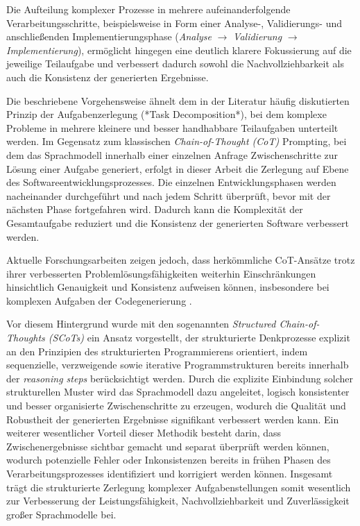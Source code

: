 Die Aufteilung komplexer Prozesse in mehrere aufeinanderfolgende Verarbeitungsschritte, beispielsweise in Form einer Analyse-, Validierungs- und anschließenden Implementierungsphase (\textit{Analyse} $\rightarrow$ \textit{Validierung} $\rightarrow$ \textit{Implementierung}), ermöglicht hingegen eine deutlich klarere Fokussierung auf die jeweilige Teilaufgabe und verbessert dadurch sowohl die Nachvollziehbarkeit als auch die Konsistenz der generierten Ergebnisse.

Die beschriebene Vorgehensweise ähnelt dem in der Literatur häufig diskutierten Prinzip der Aufgabenzerlegung (*Task Decomposition*), bei dem komplexe Probleme in mehrere kleinere und besser handhabbare Teilaufgaben unterteilt werden. Im Gegensatz zum klassischen \textit{Chain-of-Thought (CoT)} Prompting, bei dem das Sprachmodell innerhalb einer einzelnen Anfrage Zwischenschritte zur Lösung einer Aufgabe generiert, erfolgt in dieser Arbeit die Zerlegung auf Ebene des Softwareentwicklungsprozesses. Die einzelnen Entwicklungsphasen werden nacheinander durchgeführt und nach jedem Schritt überprüft, bevor mit der nächsten Phase fortgefahren wird. Dadurch kann die Komplexität der Gesamtaufgabe reduziert und die Konsistenz der generierten Software verbessert werden.

Aktuelle Forschungsarbeiten zeigen jedoch, dass herkömmliche CoT-Ansätze trotz ihrer verbesserten Problemlösungsfähigkeiten weiterhin Einschränkungen hinsichtlich Genauigkeit und Konsistenz aufweisen können, insbesondere bei komplexen Aufgaben der Codegenerierung \cite{cot10_1145_3690635}.

Vor diesem Hintergrund wurde mit den sogenannten \textit{Structured Chain-of-Thoughts (SCoTs) } ein Ansatz vorgestellt, der strukturierte Denkprozesse explizit an den Prinzipien des strukturierten Programmierens orientiert, indem sequenzielle, verzweigende sowie iterative Programmstrukturen bereits innerhalb der \textit{reasoning steps} berücksichtigt werden.
Durch die explizite Einbindung solcher strukturellen Muster wird das Sprachmodell dazu angeleitet, logisch konsistenter und besser organisierte Zwischenschritte zu erzeugen, wodurch die Qualität und Robustheit der generierten Ergebnisse signifikant verbessert werden kann.
Ein weiterer wesentlicher Vorteil dieser Methodik besteht darin, dass Zwischenergebnisse sichtbar gemacht und separat überprüft werden können, wodurch potenzielle Fehler oder Inkonsistenzen bereits in frühen Phasen des Verarbeitungsprozesses identifiziert und korrigiert werden können.
Insgesamt trägt die strukturierte Zerlegung komplexer Aufgabenstellungen somit wesentlich zur Verbesserung der Leistungsfähigkeit, Nachvollziehbarkeit und Zuverlässigkeit großer Sprachmodelle bei.

